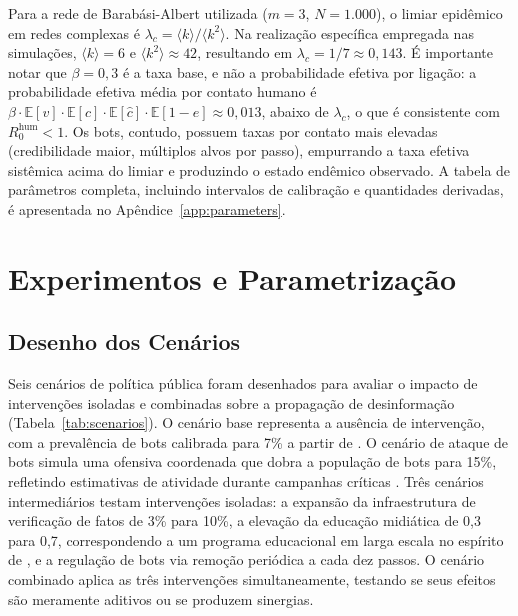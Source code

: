 \documentclass[12pt,a4paper]{article}
\theoremstyle{definition}
\theoremstyle{plain}
\begin{document}
Para a rede de Barabási-Albert utilizada ($m = 3$, $N = 1{.}000$), o limiar epidêmico em redes complexas \citep{pastor2001epidemic} é $\lambda_c = \langle k \rangle/\langle k^2 \rangle$. Na realização específica empregada nas simulações, $\langle k \rangle = 6$ e $\langle k^2 \rangle \approx 42$, resultando em $\lambda_c = 1/7 \approx 0{,}143$. É importante notar que $\beta = 0{,}3$ é a taxa base, e não a probabilidade efetiva por ligação: a probabilidade efetiva média por contato humano é $\beta \cdot \mathbb{E}[v] \cdot \mathbb{E}[c] \cdot \mathbb{E}[\hat{c}] \cdot \mathbb{E}[1-e] \approx 0{,}013$, abaixo de $\lambda_c$, o que é consistente com $R_0^{\text{hum}} < 1$. Os bots, contudo, possuem taxas por contato mais elevadas (credibilidade maior, múltiplos alvos por passo), empurrando a taxa efetiva sistêmica acima do limiar e produzindo o estado endêmico observado. A tabela de parâmetros completa, incluindo intervalos de calibração e quantidades derivadas, é apresentada no Apêndice~\ref{app:parameters}.

\section{Experimentos e Parametrização}
\label{sec:experiments}

\subsection{Desenho dos Cenários}
\label{subsec:scenarios}

Seis cenários de política pública foram desenhados para avaliar o impacto de intervenções isoladas e combinadas sobre a propagação de desinformação (Tabela~\ref{tab:scenarios}). O cenário base representa a ausência de intervenção, com a prevalência de bots calibrada para 7\% a partir de \citet{ruediger2018bots}. O cenário de ataque de bots simula uma ofensiva coordenada que dobra a população de bots para 15\%, refletindo estimativas de atividade durante campanhas críticas \citep{bessi2016social, stella2018bots}. Três cenários intermediários testam intervenções isoladas: a expansão da infraestrutura de verificação de fatos de 3\% para 10\%, a elevação da educação midiática de 0,3 para 0,7, correspondendo a um programa educacional em larga escala no espírito de \citet{huang2024media}, e a regulação de bots via remoção periódica a cada dez passos. O cenário combinado aplica as três intervenções simultaneamente, testando se seus efeitos são meramente aditivos ou se produzem sinergias.
\end{document}
